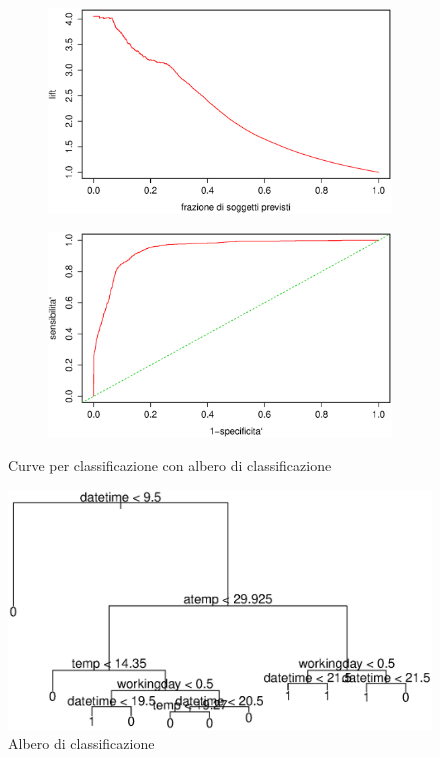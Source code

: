 \begin{figure}[H]
  \begin{subfigure}{0.4\textwidth}
    \includegraphics[width=\columnwidth]{images/class/lift-tree.eps}
  \end{subfigure}
  \hspace*{\fill}
  \begin{subfigure}{0.4\textwidth}
    \includegraphics[width=\columnwidth]{images/class/roc-tree.eps}
  \end{subfigure}
  \caption{Curve per classificazione con albero di classificazione}
  \label{fig:class-tree}
\end{figure}

\begin{figure}[H]
  \centering
  \includegraphics[width=.5\columnwidth]{images/class/final-tree.eps}
  \caption{Albero di classificazione}
  \label{fig:final-class-tree}
\end{figure}

